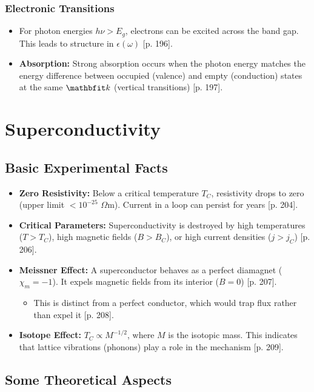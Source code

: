 \documentclass[a4paper,oneside,article]{memoir}
\begin{document}
\subsection{Electronic Transitions}
\begin{itemize}
    \item For photon energies $h\nu > E_g$, electrons can be excited across the band gap. This leads to structure in $\epsilon(\omega)$ [p. 196].
    \item \textbf{Absorption:} Strong absorption occurs when the photon energy matches the energy difference between occupied (valence) and empty (conduction) states at the same $\v{k}$ (vertical transitions) [p. 197].
\end{itemize}

\chapter{Superconductivity}

\section{Basic Experimental Facts}
\begin{itemize}
    \item \textbf{Zero Resistivity:} Below a critical temperature $T_C$, resistivity drops to zero (upper limit $< 10^{-25}$ $\Omega$m). Current in a loop can persist for years [p. 204].
    \item \textbf{Critical Parameters:} Superconductivity is destroyed by high temperatures ($T > T_C$), high magnetic fields ($B > B_C$), or high current densities ($j > j_C$) [p. 206].
    \item \textbf{Meissner Effect:} A superconductor behaves as a perfect diamagnet ($\chi_m = -1$). It expels magnetic fields from its interior ($B=0$) [p. 207].
    \begin{itemize}
        \item This is distinct from a perfect conductor, which would trap flux rather than expel it [p. 208].
    \end{itemize}
    \item \textbf{Isotope Effect:} $T_C \propto M^{-1/2}$, where $M$ is the isotopic mass. This indicates that lattice vibrations (phonons) play a role in the mechanism [p. 209].
\end{itemize}

\section{Some Theoretical Aspects}
\end{document}
